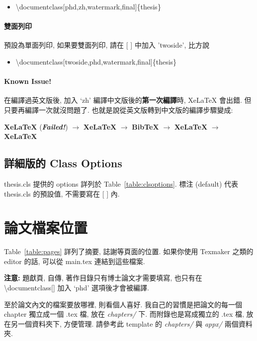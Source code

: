\begin{itemize}
\item \textbackslash documentclass[phd,zh,watermark,final]\{thesis\}
\end{itemize}

\paragraph{雙面列印} 預設為單面列印, 如果要雙面列印, 請在 [ ] 中加入 'twoside', 比方說

\begin{itemize}
\item \textbackslash documentclass[twoside,phd,watermark,final]\{thesis\}
\end{itemize}

\paragraph{Known Issue!} 在編譯過英文版後, 加入 `zh' 編譯中文版後的\textbf{第一次編譯}時, XeLaTeX 會出錯.
但只要再編譯一次就沒問題了.
也就是說從英文版轉到中文版的編譯步驟變成:

\hspace{2em} \textbf{XeLaTeX} (\textbf{\textit{Failed!}}) $\rightarrow$ \textbf{XeLaTeX} $\rightarrow$ \textbf{BibTeX} $\rightarrow$ \textbf{XeLaTeX} $\rightarrow$ \textbf{XeLaTeX}

\subsection{詳細版的 Class Options}

thesis.cls 提供的 options 詳列於 Table~\ref{table:clsoptions}.
標注 (default) 代表 thesis.cls 的預設值, 不需要寫在 [ ] 內.



\section{論文檔案位置}

Table~\ref{table:pages} 詳列了摘要, 誌謝等頁面的位置.
如果你使用 Texmaker 之類的 editor 的話, 可以從 main.tex 連結到這些檔案.

\textbf{注意:} 題獻頁, 自傳, 著作目錄只有博士論文才需要填寫, 也只有在 \textbackslash documentclass[] 加入 `phd' 選項後才會被編譯.



至於論文內文的檔案要放哪裡, 則看個人喜好.
我自己的習慣是把論文的每一個 chapter 獨立成一個 .tex 檔, 放在 \textit{chapters/} 下.
而附錄也是寫成獨立的 .tex 檔, 放在另一個資料夾下, 方便管理.
請參考此 template 的 \textit{chapters/} 與 \textit{appx/} 兩個資料夾.
